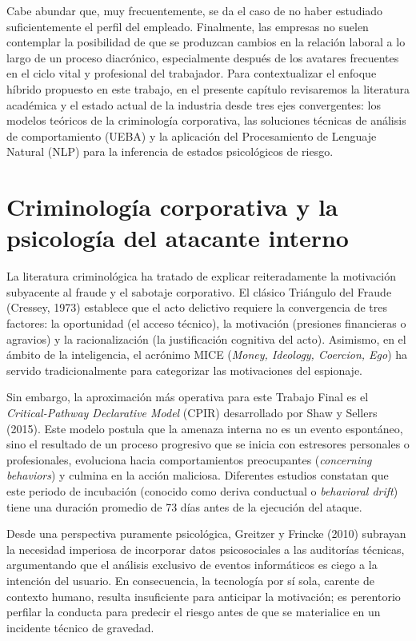 \documentclass[IB]{TFUOC}%
\begin{document}
\medskip
\noindent Cabe abundar que, muy frecuentemente, se da el caso de no haber estudiado suficientemente el perfil del empleado. Finalmente, las empresas no suelen contemplar la posibilidad de que se produzcan cambios en la relación laboral a lo largo de un proceso diacrónico, especialmente después de los avatares frecuentes en el ciclo vital y profesional del trabajador. Para contextualizar el enfoque híbrido propuesto en este trabajo, en el presente capítulo revisaremos la literatura académica y el estado actual de la industria desde tres ejes convergentes: los modelos teóricos de la criminología corporativa, las soluciones técnicas de análisis de comportamiento (UEBA) y la aplicación del Procesamiento de Lenguaje Natural (NLP) para la inferencia de estados psicológicos de riesgo.

\section{Criminología corporativa y la psicología del atacante interno}

La literatura criminológica ha tratado de explicar reiteradamente la motivación subyacente al fraude y el sabotaje corporativo. El clásico Triángulo del Fraude (Cressey, 1973) establece que el acto delictivo requiere la convergencia de tres factores: la oportunidad (el acceso técnico), la motivación (presiones financieras o agravios) y la racionalización (la justificación cognitiva del acto). Asimismo, en el ámbito de la inteligencia, el acrónimo MICE (\textit{Money, Ideology, Coercion, Ego}) ha servido tradicionalmente para categorizar las motivaciones del espionaje.

\medskip
\noindent Sin embargo, la aproximación más operativa para este Trabajo Final es el \textit{Critical-Pathway Declarative Model} (CPIR) desarrollado por Shaw y Sellers (2015). Este modelo postula que la amenaza interna no es un evento espontáneo, sino el resultado de un proceso progresivo que se inicia con estresores personales o profesionales, evoluciona hacia comportamientos preocupantes (\textit{concerning behaviors}) y culmina en la acción maliciosa. Diferentes estudios constatan que este periodo de incubación (conocido como deriva conductual o \textit{behavioral drift}) tiene una duración promedio de 73 días antes de la ejecución del ataque.

\medskip
\noindent Desde una perspectiva puramente psicológica, Greitzer y Frincke (2010) subrayan la necesidad imperiosa de incorporar datos psicosociales a las auditorías técnicas, argumentando que el análisis exclusivo de eventos informáticos es ciego a la intención del usuario. En consecuencia, la tecnología por sí sola, carente de contexto humano, resulta insuficiente para anticipar la motivación; es perentorio perfilar la conducta para predecir el riesgo antes de que se materialice en un incidente técnico de gravedad.
\end{document}
